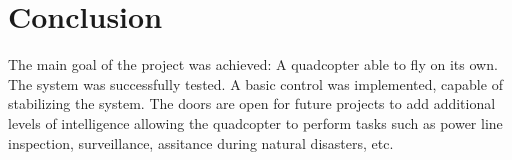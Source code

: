 \documentclass[conference]{IEEEtran}
\begin{document}
%





\section{Conclusion}

The main goal of the project was achieved: A quadcopter able to fly on its own. The system was successfully tested. A basic control was implemented, capable of stabilizing the system. The doors are open for future projects to add additional levels of intelligence allowing the quadcopter to perform tasks such as power line inspection, surveillance, assitance during natural disasters, etc.
\end{document}
